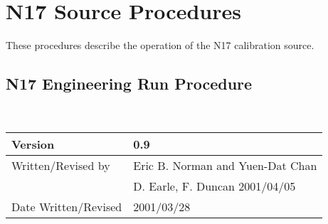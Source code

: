 

  
\section{N17 Source Procedures}

  These procedures describe the operation of the N17 calibration
source.


\newpage
\subsection{N17 Engineering Run Procedure}
~\\
\noindent
\begin{tabular}{|l|l|}
\hline
Version              & 0.9 \\
\hline
Written/Revised by   & Eric B. Norman and Yuen-Dat Chan \\
                     & D. Earle, F. Duncan 2001/04/05 \\
\hline
Date Written/Revised & 2001/03/28\\
\hline
\end{tabular}


\newpage
